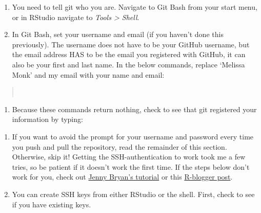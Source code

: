 \documentclass[12pt,]{article}
\providecommand{\tightlist}{%
  \setlength{\itemsep}{0pt}\setlength{\parskip}{0pt}}
\begin{document}
\begin{enumerate}
\def\labelenumi{\arabic{enumi}.}
\item
  You need to tell git who you are. Navigate to Git Bash from your start
  menu, or in RStudio navigate to \emph{Tools \textgreater{} Shell}.
\item
  In Git Bash, set your username and email (if you haven't done this
  previously). The username does not have to be your GitHub username,
  but the email address HAS to be the email you registered with GitHub,
  it can also be your first and last name. In the below commands,
  replace `Melissa Monk' and my email with your name and email:
\end{enumerate}

\begin{quote}
\colorbox{light-gray}{}\\
\colorbox{light-gray}{}
\end{quote}

\begin{enumerate}
\def\labelenumi{\arabic{enumi}.}
\setcounter{enumi}{2}
\tightlist
\item
  Because these commands return nothing, check to see that git
  registered your information by typing:
\end{enumerate}

\begin{quote}
\colorbox{light-gray}{}
\end{quote}

\begin{enumerate}
\def\labelenumi{\arabic{enumi}.}
\setcounter{enumi}{3}
\item
  If you want to avoid the prompt for your username and password every
  time you push and pull the repository, read the remainder of this
  section. Otherwise, skip it! Getting the SSH-authentication to work
  took me a few tries, so be patient if it doesn't work the first time.
  If the steps below don't work for you, check out
  \href{http://happygitwithr.com/}{Jenny Bryan's tutorial} or this
  \href{http://www.r-bloggers.com/rstudio-pushing-to-github-with-ssh-authentication/}{R-blogger
  post}.
\item
  You can create SSH keys from either RStudio or the shell. First, check
  to see if you have existing keys.
\end{enumerate}
\end{document}
